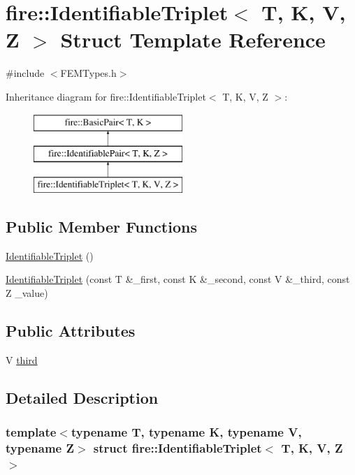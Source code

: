 \hypertarget{a00776}{}\section{fire\+:\+:Identifiable\+Triplet$<$ T, K, V, Z $>$ Struct Template Reference}
\label{a00776}


{\ttfamily \#include $<$F\+E\+M\+Types.\+h$>$}

Inheritance diagram for fire\+:\+:Identifiable\+Triplet$<$ T, K, V, Z $>$\+:\begin{figure}[H]
\begin{center}
\leavevmode
\includegraphics[height=3.000000cm]{a00776}
\end{center}
\end{figure}
\subsection*{Public Member Functions}
\begin{DoxyCompactItemize}
\item 
\hyperlink{a00776_aadcc9b484d16fc1f286e969bad059976}{Identifiable\+Triplet} ()
\item 
\hyperlink{a00776_a4c43fb95e33d2b67ffb934991a986b68}{Identifiable\+Triplet} (const T \&\+\_\+first, const K \&\+\_\+second, const V \&\+\_\+third, const Z \+\_\+value)
\end{DoxyCompactItemize}
\subsection*{Public Attributes}
\begin{DoxyCompactItemize}
\item 
V \hyperlink{a00776_a0f60248b00531643f3c6bb8e68781f04}{third}
\end{DoxyCompactItemize}


\subsection{Detailed Description}
\subsubsection*{template$<$typename T, typename K, typename V, typename Z$>$\newline
struct fire\+::\+Identifiable\+Triplet$<$ T, K, V, Z $>$}

